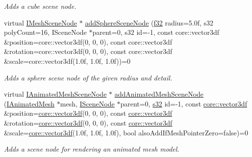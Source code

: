 \begin{DoxyCompactItemize}
\begin{DoxyCompactList}\small\item\em Adds a cube scene node. \end{DoxyCompactList}\item 
virtual \hyperlink{classirr_1_1scene_1_1IMeshSceneNode}{I\+Mesh\+Scene\+Node} $\ast$ \hyperlink{classirr_1_1scene_1_1ISceneManager_acd6454347276ff8c74e46063970cfc04}{add\+Sphere\+Scene\+Node} (\hyperlink{namespaceirr_a0277be98d67dc26ff93b1a6a1d086b07}{f32} radius=5.\+0f, s32 poly\+Count=16, I\+Scene\+Node $\ast$parent=0, s32 id=-\/1, const core\+::vector3df \&position=core\+::vector3df(0, 0, 0), const core\+::vector3df \&rotation=core\+::vector3df(0, 0, 0), const core\+::vector3df \&scale=core\+::vector3df(1.\+0f, 1.\+0f, 1.\+0f))=0
\begin{DoxyCompactList}\small\item\em Adds a sphere scene node of the given radius and detail. \end{DoxyCompactList}\item 
virtual \hyperlink{classirr_1_1scene_1_1IAnimatedMeshSceneNode}{I\+Animated\+Mesh\+Scene\+Node} $\ast$ \hyperlink{classirr_1_1scene_1_1ISceneManager_a8e2e0cd3a27e85b4116855dd2f3365b8}{add\+Animated\+Mesh\+Scene\+Node} (\hyperlink{classirr_1_1scene_1_1IAnimatedMesh}{I\+Animated\+Mesh} $\ast$mesh, \hyperlink{classirr_1_1scene_1_1ISceneNode}{I\+Scene\+Node} $\ast$parent=0, \hyperlink{namespaceirr_ac66849b7a6ed16e30ebede579f9b47c6}{s32} id=-\/1, const \hyperlink{namespaceirr_1_1core_ae6e2b2a6c552833ebbd5b7463d03586b}{core\+::vector3df} \&position=\hyperlink{namespaceirr_1_1core_ae6e2b2a6c552833ebbd5b7463d03586b}{core\+::vector3df}(0, 0, 0), const \hyperlink{namespaceirr_1_1core_ae6e2b2a6c552833ebbd5b7463d03586b}{core\+::vector3df} \&rotation=\hyperlink{namespaceirr_1_1core_ae6e2b2a6c552833ebbd5b7463d03586b}{core\+::vector3df}(0, 0, 0), const \hyperlink{namespaceirr_1_1core_ae6e2b2a6c552833ebbd5b7463d03586b}{core\+::vector3df} \&scale=\hyperlink{namespaceirr_1_1core_ae6e2b2a6c552833ebbd5b7463d03586b}{core\+::vector3df}(1.\+0f, 1.\+0f, 1.\+0f), bool also\+Add\+If\+Mesh\+Pointer\+Zero=false)=0
\begin{DoxyCompactList}\small\item\em Adds a scene node for rendering an animated mesh model. \end{DoxyCompactList}\item 

\end{DoxyCompactItemize}
